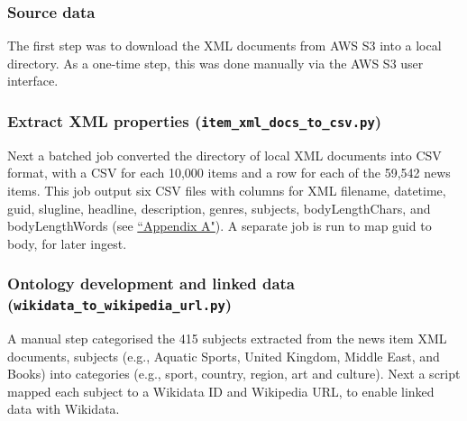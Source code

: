 \documentclass[11pt]{article}
\begin{document}
  \subsubsection{Source data}
  The first step was to download the XML documents from AWS S3 into a local directory. As a one-time step, this was done manually via the AWS S3 user interface.

  \subsubsection{Extract XML properties (\lstinline{item_xml_docs_to_csv.py})}
  Next a batched job converted the directory of local XML documents into CSV format, with a CSV for each 10,000 items and a row for each of the 59,542 news items. This job output six CSV files with columns for XML filename, datetime, guid, slugline, headline, description, genres, subjects, bodyLengthChars, and bodyLengthWords (see \hyperref[sec:AppendixA]{``Appendix A"}). A separate job is run to map guid to body, for later ingest.
  
  \subsubsection{Ontology development and linked data (\lstinline{wikidata_to_wikipedia_url.py})}
  A manual step categorised the 415 subjects extracted from the news item XML documents, subjects (e.g., Aquatic Sports, United Kingdom, Middle East, and Books) into categories (e.g., sport, country, region, art and culture). Next a script mapped each subject to a Wikidata ID and Wikipedia URL, to enable linked data with Wikidata.
  
\end{document}
